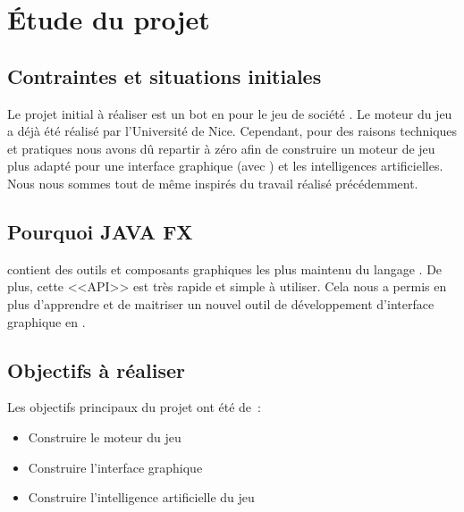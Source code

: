 \section{Étude du projet}
\subsection{Contraintes et situations initiales}
Le projet initial à réaliser est un bot en \java pour le jeu de société \himalaya. Le moteur du jeu a déjà été réalisé par l'Université de Nice. Cependant, pour des raisons techniques et pratiques nous avons dû repartir à zéro afin de construire un moteur de jeu plus adapté pour une interface graphique (avec \fx) et les intelligences artificielles. Nous nous sommes tout de même inspirés du travail réalisé précédemment.

\subsection{Pourquoi JAVA FX}
\fx contient des outils et composants graphiques les plus maintenu du langage \java.
De plus, cette <<API>> est très rapide et simple à utiliser.
Cela nous a permis en plus d’apprendre et de maitriser un nouvel outil de développement d’interface graphique en \java.

\subsection{Objectifs à réaliser}
Les objectifs principaux du projet ont été de :
\begin{itemize} 
	\item Construire le moteur du jeu 
	\item Construire l'interface graphique
	\item Construire l’intelligence artificielle du jeu
\end{itemize}